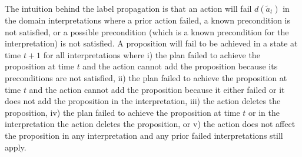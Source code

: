 \documentclass{article}
\newtheorem{theorem}{Theorem}[section]
\begin{document}
%



\noindent  The intuition behind the label propagation is that an action will fail $d(\tilde{a}_t)$ in the domain interpretations where a prior action failed, a known precondition is not satisfied, or a possible precondition (which is a known precondition for the interpretation) is not satisfied.  A proposition will fail to be achieved in a state at time $t+1$ for all interpretations where i) the plan failed to achieve the proposition at time $t$ and the action cannot add the proposition because its preconditions are not satisfied, ii) the plan failed to achieve the proposition at time $t$ and the action cannot add the proposition because it either failed or it does not add the proposition in the interpretation, iii) the action deletes the proposition, iv) the plan failed to achieve the proposition at time $t$ or in the interpretation the action deletes the proposition, or v) the action does not affect the proposition in any interpretation and any prior failed interpretations still apply.
\end{document}
